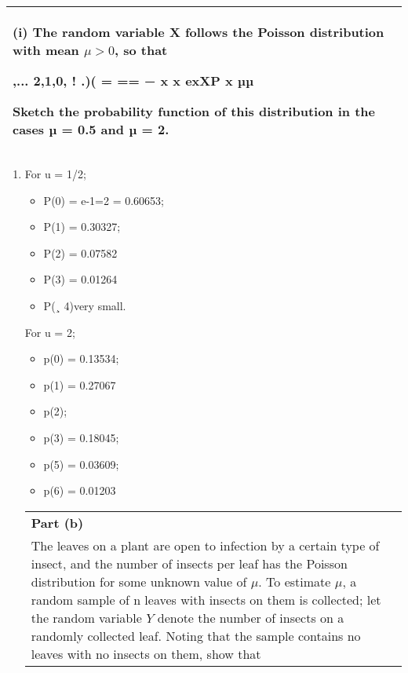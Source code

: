 \documentclass[a4paper,12pt]{article}
\begin{document}
  \begin{table}[ht!]
  \centering
  \begin{tabular}{|p{15cm}|}
  \hline
(i) The random variable X follows the Poisson distribution with mean $\mu > 0$, so that 
 
   ,... 2,1,0, ! .)( = == − x x exXP x µµ
 
 
 Sketch the probability function of this distribution in the cases µ = 0.5 and µ = 2. 
 \\ \hline 
   \end{tabular}
 \end{table}
 

 


\begin{enumerate}
 \item  For u = 1/2; 
 
\begin{itemize}   
\item P(0) = e-1=2 = 0.60653; 
\item P(1) = 0.30327; 
\item P(2) = 0.07582
\item P(3) =
0.01264
\item P(¸ 4)very small.
\end{itemize}

For u = 2; 
\begin{itemize}   
\item p(0) = 0.13534; 
\item p(1) = 0.27067 
\item p(2); 
\item p(3) = 0.18045; 
\item p(5) = 0.03609; 
\item p(6) = 0.01203
\end{itemize}
\newpage
  \begin{table}[ht!]
  \centering
  \begin{tabular}{|p{15cm}|}
  \hline
\noindent \textbf{Part (b)} \\ The leaves on a plant are open to infection by a certain type of insect, and the number of insects per leaf has the Poisson distribution for some unknown value of $\mu$.  To estimate $\mu$, a random sample of n leaves with insects on them is collected;  let the random variable $Y$ denote the number of insects on a randomly collected leaf.  Noting that the sample contains no leaves with no insects on them, show that 
 

\end{tabular}
\end{table}
\end{enumerate}
\end{document}
